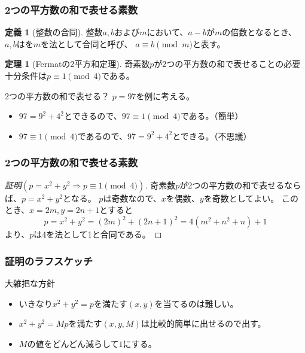 \documentclass[dvipdfmx,11pt,notheorems]{beamer}
\theoremstyle{definition}
\newtheorem{theorem}{定理}
\newtheorem{definition}{定義}
\begin{document}
\begin{frame}\frametitle{2つの平方数の和で表せる素数}

\begin{definition}[整数の合同]
整数$a, b$および$m$において、$a-b$が$m$の倍数となるとき、$a, b$はを$m$を法として合同と呼び、
$a \equiv b \pmod{m}$と表す。
\end{definition}

\begin{theorem}[Fermatの2平方和定理]
奇素数$p$が2つの平方数の和で表せることの必要十分条件は$p \equiv 1 \pmod{4}$である。
\end{theorem}

\begin{exampleblock}{2つの平方数の和で表せる？}
$p=97$を例に考える。
\begin{itemize}
\item $97 = 9^{2} + 4^{2}$とできるので、$97 \equiv 1 \pmod{4}$である。（簡単）
\item $97 \equiv 1 \pmod{4}$であるので、$97 = 9^{2} + 4^{2}$とできる。（不思議）
\end{itemize}
\end{exampleblock}

\end{frame}

\begin{frame}\frametitle{2つの平方数の和で表せる素数}

\begin{proof}[証明$(p = x^{2}+y^{2}\Rightarrow p \equiv 1 \pmod{4})$]
奇素数$p$が2つの平方数の和で表せるならば、$p=x^{2}+y^{2}$となる。
$p$は奇数なので、$x$を偶数、$y$を奇数としてよい。
このとき、$x=2m, y=2n+1$とすると
\begin{equation*}
p = x^{2}+y^{2} = (2m)^{2} + (2n + 1)^{2} = 4(m^{2} + n^{2} + n) + 1
\end{equation*}
より、$p$は4を法として1と合同である。

\end{proof}

\end{frame}

\begin{frame}\frametitle{証明のラフスケッチ}

\begin{block}{大雑把な方針}
\begin{itemize}
\item いきなり$x^{2} + y^{2}=p$を満たす$(x, y)$を当てるのは難しい。
\item $x^{2} + y^{2}=Mp$を満たす$(x, y, M)$は比較的簡単に出せるので出す。
\item $M$の値をどんどん減らして$1$にする。
\end{itemize}
\end{block}

\end{frame}
\end{document}
